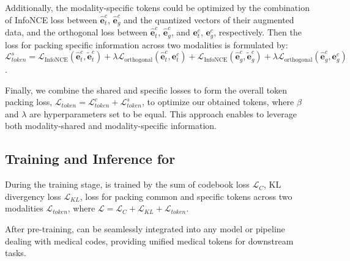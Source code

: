 Additionally, the modality-specific tokens could be optimized by the combination of InfoNCE loss between $\mathbf{\hat{e}}_{t}^{c}$, $\mathbf{\hat{e}}_{g}^{c}$ and the quantized vectors of their augmented data, and the orthogonal loss between $\mathbf{\hat{e}}_{t}^{c}$, $\mathbf{\hat{e}}_{g}^{c}$, and $\mathbf{e}_{t}^{c}$, $\mathbf{e}_{g}^{c}$, respectively. Then the loss for packing specific information across two modalities is formulated by: $\mathcal{L}_{token}^{s} = \mathcal{L}_{\mathrm{InfoNCE}}(\mathbf{\hat{e}}_{t}^{c}, \mathbf{\tilde{e}}_{t}^{c}) + \lambda \mathcal{L}_{\mathrm{orthogonal}}(\mathbf{\hat{e}}_{t}^{c}, \mathbf{e}_{t}^{c}) + \mathcal{L}_{\mathrm{InfoNCE}}(\mathbf{\hat{e}}_{g}^{c}, \mathbf{\tilde{e}}_{g}^{c}) + \lambda \mathcal{L}_{\mathrm{orthogonal}}(\mathbf{\hat{e}}_{g}^{c}, \mathbf{e}_{g}^{c})$. 

Finally, we combine the shared and specific losses to form the overall token packing loss, $\mathcal{L}_{token} = \mathcal{L}_{token}^{c}+\mathcal{L}_{token}^{s}$, to optimize our obtained tokens, where $\beta$ and $\lambda$ are hyperparameters set to be equal. This approach enables \model to leverage both modality-shared and modality-specific information. 

\subsection{Training and Inference for \model}
During the training stage, \model is trained by the sum of codebook loss $\mathcal{L}_{C}$, KL divergency loss $\mathcal{L}_{KL}$, loss for packing common and specific tokens across two modalities $\mathcal{L}_{token}$, where $\mathcal{L} = \mathcal{L}_{C} + \mathcal{L}_{KL} + \mathcal{L}_{token}$.

After pre-training, \model can be seamlessly integrated into any model or pipeline dealing with medical codes, providing unified medical tokens for downstream tasks.